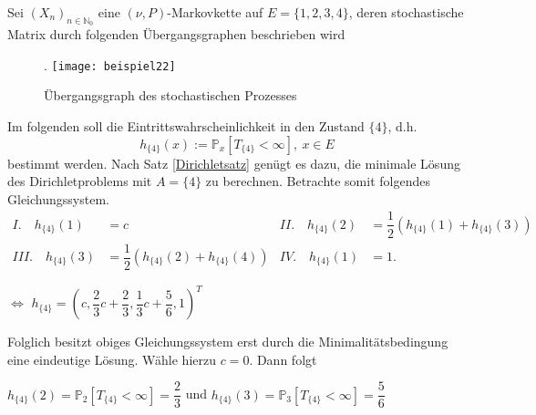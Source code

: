 Sei $(X_{n})_{n \in \mathbb{N}_{0}}$ eine $(\nu,P)$-Markovkette auf $E = \lbrace 1,2,3,4 \rbrace$, deren stochastische Matrix durch folgenden Übergangsgraphen beschrieben wird
\begin{figure}[H].
\centering
\texttt{[image: beispiel22]}
\caption{Übergangsgraph des stochastischen Prozesses}
\end{figure}
\noindent
Im folgenden soll die Eintrittswahrscheinlichkeit in den Zustand $\lbrace 4 \rbrace$, d.h.
\begin{equation*}
h_{\lbrace    4 \rbrace}(x) := \mathbb{P}_{x}[T_{\lbrace 4 \rbrace} < \infty], \: x \in E
\end{equation*}
bestimmt werden. Nach Satz \ref{Dirichletsatz} genügt es dazu, die minimale Lösung des Dirichletproblems mit $A=\lbrace 4 \rbrace$ zu berechnen. Betrachte somit folgendes Gleichungssystem.
\begin{align*}
     I. \quad h_{\lbrace 4 \rbrace}(1) &= c          & II. \quad h_{\lbrace 4 \rbrace}(2) &= \dfrac{1}{2}(h_{\lbrace 4 \rbrace}(1) + h_{\lbrace 4 \rbrace}(3))  \,  \\ 
  III. \quad h_{\lbrace 4 \rbrace}(3) &= \dfrac{1}{2}(h_{\lbrace 4 \rbrace}(2) + h_{\lbrace 4 \rbrace}(4))   & IV. \quad h_{\lbrace    4 \rbrace}(1) &= 1.
\end{align*}
\begin{center}
$\Leftrightarrow$ $h_{\lbrace 4 \rbrace} = (c, \dfrac{2}{3}c + \dfrac{2}{3}, \dfrac{1}{3}c + \dfrac{5}{6},1)^{T}$
\end{center}
Folglich besitzt obiges Gleichungssystem erst durch die Minimalitätsbedingung eine eindeutige Lösung. Wähle hierzu $c=0$. Dann folgt
\begin{center}
$h_{\lbrace 4 \rbrace}(2) = \mathbb{P}_{2}[T_{\lbrace 4 \rbrace} < \infty] = \dfrac{2}{3}$ und $h_{\lbrace 4 \rbrace}(3) = \mathbb{P}_{3}[T_{\lbrace 4 \rbrace} < \infty] = \dfrac{5}{6}$
\end{center}